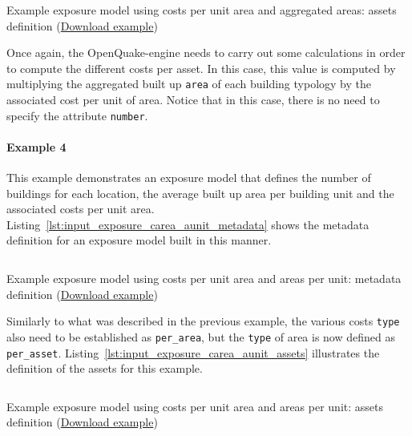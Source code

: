 \begin{listing}[htbp]
  \inputminted[firstline=21,firstnumber=21,lastline=31,fontsize=\footnotesize,frame=single,linenos,bgcolor=lightgray]{xml}{oqum/risk/Verbatim/input_exposure_carea_aagg.xml}
  \caption{Example exposure model using costs per unit area and aggregated areas: assets definition (\href{https://raw.githubusercontent.com/GEMScienceTools/oq-engine-docs/master/oqum/risk/verbatim/input_exposure_carea_aagg.xml}{Download example})}
  \label{lst:input_exposure_carea_aagg_assets}
\end{listing}

Once again, the OpenQuake-engine needs to carry out some calculations in order
to compute the different costs per asset. In this case, this value is computed
by multiplying the aggregated built up \Verb+area+ of each building typology
by the associated cost per unit of area. Notice that in this case, there is no
need to specify the attribute \Verb+number+.


\paragraph{Example 4}

This example demonstrates an \gls{exposure model} that defines the number of
buildings for each location, the average built up area per building unit and
the associated costs per unit area.
Listing~\ref{lst:input_exposure_carea_aunit_metadata} shows the metadata
definition for an exposure model built in this manner.

\begin{listing}[htbp]
  \inputminted[firstline=8,firstnumber=8,lastline=20,fontsize=\footnotesize,frame=single,linenos,bgcolor=lightgray]{xml}{oqum/risk/Verbatim/input_exposure_carea_aunit.xml}
  \caption{Example exposure model using costs per unit area and areas per unit: metadata definition (\href{https://raw.githubusercontent.com/GEMScienceTools/oq-engine-docs/master/oqum/risk/verbatim/input_exposure_carea_aunit.xml}{Download example})}
  \label{lst:input_exposure_carea_aunit_metadata}
\end{listing}

Similarly to what was described in the previous example, the various costs
\Verb+type+ also need to be established as \Verb+per_area+, but the
\Verb+type+ of area is now defined as \Verb+per_asset+.
Listing~\ref{lst:input_exposure_carea_aunit_assets} illustrates the definition
of the assets for this example.

\begin{listing}[htbp]
  \inputminted[firstline=21,firstnumber=21,lastline=31,fontsize=\footnotesize,frame=single,linenos,bgcolor=lightgray]{xml}{oqum/risk/Verbatim/input_exposure_carea_aunit.xml}
  \caption{Example exposure model using costs per unit area and areas per unit: assets definition (\href{https://raw.githubusercontent.com/GEMScienceTools/oq-engine-docs/master/oqum/risk/verbatim/input_exposure_carea_aunit.xml}{Download example})}
  \label{lst:input_exposure_carea_aunit_assets}
\end{listing}

